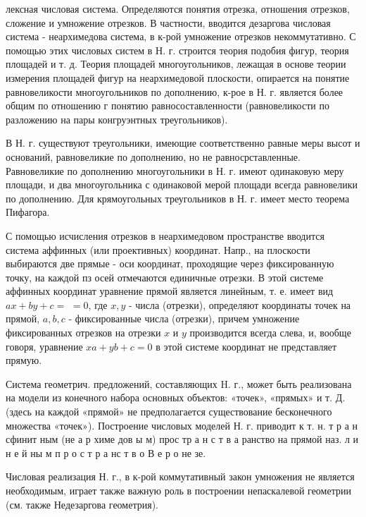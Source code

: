 \documentclass[10pt]{article}
\begin{document}
лексная числовая система. Определяются понятия отрезка, отношения отрезков, сложение и умножение отрезков. В частности, вводится дезаргова числовая система - неархимедова система, в к-рой умножение отрезков некоммутативно. С помощью этих числовых систем в Н. г. строится теория подобия фигур, теория площадей и т. д. Теория площадей многоугольников, лежащая в основе теории измерения площадей фигур на неархимедовой плоскости, опирается на понятие равновеликости многоугольников по дополнению, к-рое в Н. г. является более общим по отношению г понятию равносоставленности (равновеликости по разложению на пары конгруэнтных треугольников).



В Н. г. существуют треугольники, имеющие соответственно равные меры высот и оснований, равновеликие по дополнению, но не равносрставленные. Равновеликие по дополнению многоугольники в Н. г. имеют одинаковую меру площади, и два многоугольника с одинаковой мерой площади всегда равновелики по дополнению. Для крямоугольных треугольников в Н. г. имеет место теорема Пифагора.



С помощью исчисления отрезков в неархимедовом пространстве вводится система аффинных (или проективных) координат. Напр., на плоскости выбираются две прямые - оси координат, проходящие через фиксированную точку, на каждой пз осей отмечаются единичные отрезки. В этой системе аффинных координат уравнение прямой является линейным, т. е. имеет вид $a x+b y+c=$ $=0$, где $x, y$ - числа (отрезки), определяют координаты точек на прямой, $a, b, c$ - фиксированные числа (отрезки), причем умножение фиксированных отрезков на отрезки $x$ и $y$ производится всегда слева, и, вообще говоря, уравнение $x a+y b+c=0$ в этой системе координат не представляет прямую.



Система геометрич. предложений, составляющих $\mathrm{H}$. г., может быть реализована на модели из конечного набора основных объектов: «точек», «прямых» и т. Д. (здесь на каждой «прямой» не предполагается существование бесконечного множества «точек»). Построение числовых моделей Н. г. приводит к т. н. т р а н сфинит ным (не а р химе дов ы м) прос тр а н с т в а ранство на прямой наз. л и н е й ны м п р о с т р а нс т в о В е р о не зе.



Числовая реализация Н. г., в к-рой коммутативный закон умножения не является необходимым, играет также важную роль в построении непаскалевой геометрии (см. также Недезаргова геометрия).
\end{document}
